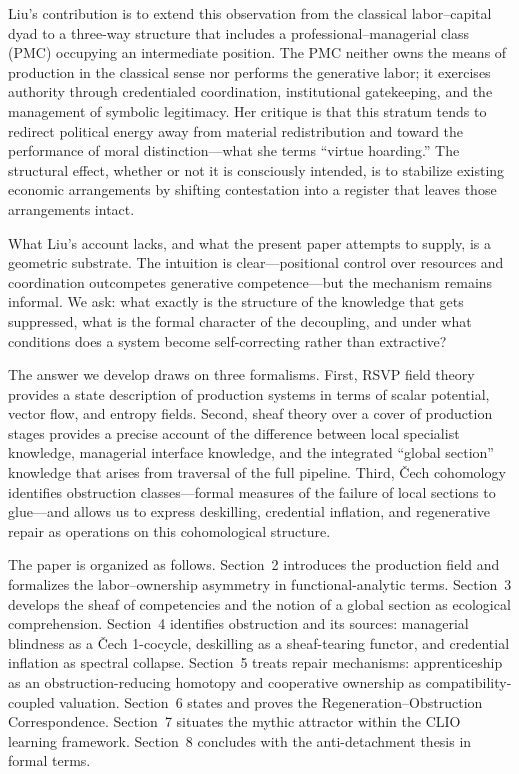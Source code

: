 \documentclass[12pt]{article}
\begin{document}
Liu's contribution is to extend this observation from the classical labor--capital dyad to a three-way structure that includes a professional--managerial class (PMC) occupying an intermediate position. The PMC neither owns the means of production in the classical sense nor performs the generative labor; it exercises authority through credentialed coordination, institutional gatekeeping, and the management of symbolic legitimacy. Her critique is that this stratum tends to redirect political energy away from material redistribution and toward the performance of moral distinction---what she terms ``virtue hoarding.'' The structural effect, whether or not it is consciously intended, is to stabilize existing economic arrangements by shifting contestation into a register that leaves those arrangements intact.

What Liu's account lacks, and what the present paper attempts to supply, is a geometric substrate. The intuition is clear---positional control over resources and coordination outcompetes generative competence---but the mechanism remains informal. We ask: what exactly is the structure of the knowledge that gets suppressed, what is the formal character of the decoupling, and under what conditions does a system become self-correcting rather than extractive?

The answer we develop draws on three formalisms. First, RSVP field theory provides a state description of production systems in terms of scalar potential, vector flow, and entropy fields. Second, sheaf theory over a cover of production stages provides a precise account of the difference between local specialist knowledge, managerial interface knowledge, and the integrated ``global section'' knowledge that arises from traversal of the full pipeline. Third, Čech cohomology identifies obstruction classes---formal measures of the failure of local sections to glue---and allows us to express deskilling, credential inflation, and regenerative repair as operations on this cohomological structure.

The paper is organized as follows. Section~2 introduces the production field and formalizes the labor--ownership asymmetry in functional-analytic terms. Section~3 develops the sheaf of competencies and the notion of a global section as ecological comprehension. Section~4 identifies obstruction and its sources: managerial blindness as a Čech 1-cocycle, deskilling as a sheaf-tearing functor, and credential inflation as spectral collapse. Section~5 treats repair mechanisms: apprenticeship as an obstruction-reducing homotopy and cooperative ownership as compatibility-coupled valuation. Section~6 states and proves the Regeneration--Obstruction Correspondence. Section~7 situates the mythic attractor within the CLIO learning framework. Section~8 concludes with the anti-detachment thesis in formal terms.
\end{document}
